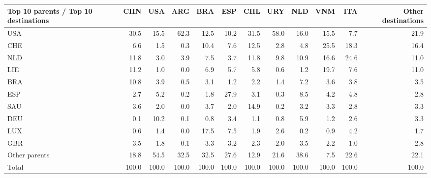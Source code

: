 \begin{tabular}{lrrrrrrrrrrr}
\toprule
Top 10 parents / Top 10 destinations & CHN & USA & ARG & BRA & ESP & CHL & URY & NLD & VNM & ITA & Other destinations \\
\midrule
USA & 30.5 & 15.5 & 62.3 & 12.5 & 10.2 & 31.5 & 58.0 & 16.0 & 15.5 & 7.7 & 21.9 \\
CHE & 6.6 & 1.5 & 0.3 & 10.4 & 7.6 & 12.5 & 2.8 & 4.8 & 25.5 & 18.3 & 16.4 \\
NLD & 11.8 & 3.0 & 3.9 & 7.5 & 3.7 & 11.8 & 9.8 & 10.9 & 16.6 & 24.6 & 11.0 \\
LIE & 11.2 & 1.0 & 0.0 & 6.9 & 5.7 & 5.8 & 0.6 & 1.2 & 19.7 & 7.6 & 11.0 \\
BRA & 10.8 & 3.9 & 0.5 & 3.1 & 1.2 & 2.2 & 1.4 & 7.2 & 3.6 & 3.8 & 3.5 \\
ESP & 2.7 & 5.2 & 0.2 & 1.8 & 27.9 & 3.1 & 0.3 & 8.5 & 4.2 & 4.8 & 2.8 \\
SAU & 3.6 & 2.0 & 0.0 & 3.7 & 2.0 & 14.9 & 0.2 & 3.2 & 3.3 & 2.8 & 3.3 \\
DEU & 0.1 & 10.2 & 0.1 & 0.8 & 3.4 & 1.1 & 0.8 & 5.9 & 1.2 & 2.6 & 3.3 \\
LUX & 0.6 & 1.4 & 0.0 & 17.5 & 7.5 & 1.9 & 2.6 & 0.2 & 0.9 & 4.2 & 1.7 \\
GBR & 3.5 & 1.8 & 0.1 & 3.3 & 3.2 & 2.3 & 2.0 & 3.5 & 2.2 & 1.0 & 2.8 \\
Other parents & 18.8 & 54.5 & 32.5 & 32.5 & 27.6 & 12.9 & 21.6 & 38.6 & 7.5 & 22.6 & 22.1 \\
\midrule
Total & 100.0 & 100.0 & 100.0 & 100.0 & 100.0 & 100.0 & 100.0 & 100.0 & 100.0 & 100.0 & 100.0 \\
\bottomrule
\end{tabular}
